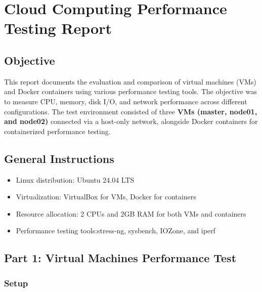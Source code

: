 \hypertarget{cloud-computing-performance-testing-report}{%
\section{Cloud Computing Performance Testing
Report}\label{cloud-computing-performance-testing-report}}

\hypertarget{objective}{%
\subsection{Objective}\label{objective}}

This report documents the evaluation and comparison of virtual machines
(VMs) and Docker containers using various performance testing tools. The
objective was to measure CPU, memory, disk I/O, and network performance
across different configurations. The test environment consisted of three
\textbf{VMs (master, node01, and node02)} connected via a host-only
network, alongside Docker containers for containerized performance
testing.

\hypertarget{general-instructions}{%
\subsection{General Instructions}\label{general-instructions}}

\begin{itemize}
\tightlist
\item
  Linux distribution: Ubuntu 24.04 LTS
\item
  Virtualization: VirtualBox for VMs, Docker for containers
\item
  Resource allocation: 2 CPUs and 2GB RAM for both VMs and containers
\item
  Performance testing tools:stress-ng, sysbench, IOZone, and iperf
\end{itemize}

\hypertarget{part-1-virtual-machines-performance-test}{%
\subsection{Part 1: Virtual Machines Performance
Test}\label{part-1-virtual-machines-performance-test}}

\hypertarget{setup}{%
\subsubsection{Setup}\label{setup}}

